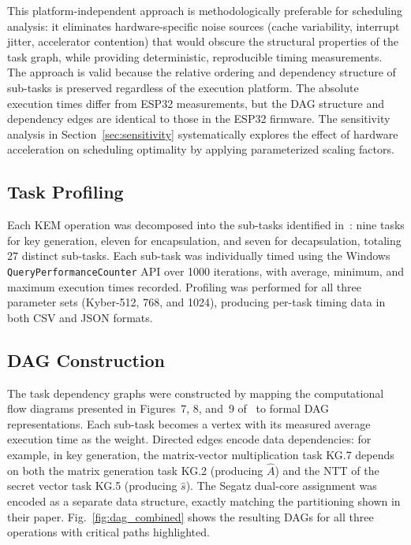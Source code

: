 \documentclass[journal]{IEEEtran}
\begin{document}
This platform-independent approach is methodologically preferable for scheduling analysis: it eliminates hardware-specific noise sources (cache variability, interrupt jitter, accelerator contention) that would obscure the structural properties of the task graph, while providing deterministic, reproducible timing measurements. The approach is valid because the relative ordering and dependency structure of sub-tasks is preserved regardless of the execution platform. The absolute execution times differ from ESP32 measurements, but the DAG structure and dependency edges are identical to those in the ESP32 firmware. The sensitivity analysis in Section~\ref{sec:sensitivity} systematically explores the effect of hardware acceleration on scheduling optimality by applying parameterized scaling factors.

\subsection{Task Profiling}

Each KEM operation was decomposed into the sub-tasks identified in~\cite{segatz2022}: nine tasks for key generation, eleven for encapsulation, and seven for decapsulation, totaling 27 distinct sub-tasks. Each sub-task was individually timed using the Windows \texttt{QueryPerformanceCounter} API over 1000 iterations, with average, minimum, and maximum execution times recorded. Profiling was performed for all three parameter sets (Kyber-512, 768, and 1024), producing per-task timing data in both CSV and JSON formats.

\subsection{DAG Construction}

The task dependency graphs were constructed by mapping the computational flow diagrams presented in Figures~7, 8, and~9 of~\cite{segatz2022} to formal DAG representations. Each sub-task becomes a vertex with its measured average execution time as the weight. Directed edges encode data dependencies: for example, in key generation, the matrix-vector multiplication task KG.7 depends on both the matrix generation task KG.2 (producing $\hat{A}$) and the NTT of the secret vector task KG.5 (producing $\hat{s}$). The Segatz dual-core assignment was encoded as a separate data structure, exactly matching the partitioning shown in their paper. Fig.~\ref{fig:dag_combined} shows the resulting DAGs for all three operations with critical paths highlighted.
\end{document}
